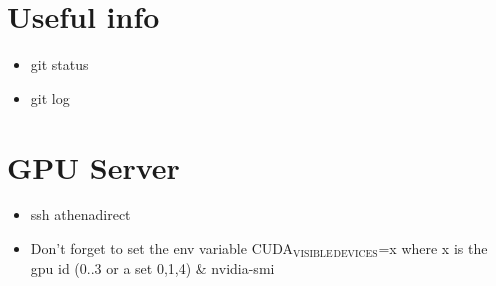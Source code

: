 \documentclass[11pt]{article}
\begin{document}
\section{Useful info}
\label{sec:org03644d8}
\begin{itemize}
\item git status
\item git log
\end{itemize}

\section{GPU Server}
\label{sec:org8b34b3d}
\begin{itemize}
\item ssh athenadirect
\item Don’t forget to set the env variable CUDA\(_{\text{VISIBLE}}\)\(_{\text{DEVICES}}\)=x where
x is the gpu id (0..3 or a set 0,1,4) \& nvidia-smi
\end{itemize}
\end{document}
